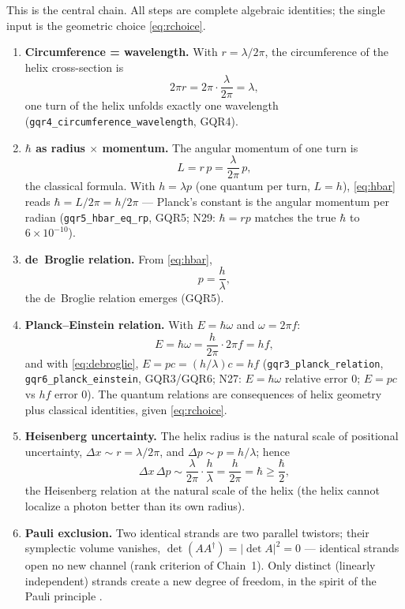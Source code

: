 \documentclass[aps,prd,preprint,superscriptaddress,amsmath,amssymb]{revtex4-2}
\begin{document}
This is the central chain.  All steps are complete algebraic
identities; the single input is the geometric choice
\eqref{eq:rchoice}.

\begin{enumerate}
\item \textbf{Circumference = wavelength.}  With $r=\lambda/2\pi$,
the circumference of the helix cross-section is
\begin{equation}
2\pi r=2\pi\cdot\frac{\lambda}{2\pi}=\lambda,
\label{eq:circ}
\end{equation}
one turn of the helix unfolds exactly one wavelength
(\texttt{gqr4\_circumference\_wavelength}, GQR4).
\item \textbf{$\hbar$ as radius $\times$ momentum.}  The angular momentum
of one turn is
\begin{equation}
L=r\,p=\frac{\lambda}{2\pi}\,p,
\label{eq:hbar}
\end{equation}
the classical formula.  With $h=\lambda p$ (one quantum per turn,
$L=h$), \eqref{eq:hbar} reads
$\hbar=L/2\pi=h/2\pi$ --- Planck's constant is the angular momentum per
radian (\texttt{gqr5\_hbar\_eq\_rp}, GQR5; N29: $\hbar=rp$ matches the
true $\hbar$ to $6\times10^{-10}$).
\item \textbf{de~Broglie relation.}  From \eqref{eq:hbar},
\begin{equation}
p=\frac{h}{\lambda},
\label{eq:debroglie}
\end{equation}
the de~Broglie relation \cite{de1924recherches} emerges (GQR5).
\item \textbf{Planck--Einstein relation.}  With $E=\hbar\omega$ and
$\omega=2\pi f$:
\begin{equation}
E=\hbar\omega=\frac{h}{2\pi}\cdot 2\pi f=hf,
\label{eq:planck}
\end{equation}
and with \eqref{eq:debroglie}, $E=pc=(h/\lambda)c=hf$
(\texttt{gqr3\_planck\_relation}, \texttt{gqr6\_planck\_einstein},
GQR3/GQR6; N27: $E=\hbar\omega$ relative error $0$; $E=pc$ vs $hf$ error
$0$).  The quantum relations are consequences of helix geometry plus
classical identities, given \eqref{eq:rchoice}.
\item \textbf{Heisenberg uncertainty.}  The helix radius is the natural
scale of positional uncertainty, $\Delta x\sim r=\lambda/2\pi$, and
$\Delta p\sim p=h/\lambda$; hence
\begin{equation}
\Delta x\,\Delta p\sim\frac{\lambda}{2\pi}\cdot\frac{h}{\lambda}
=\frac{h}{2\pi}=\hbar\ge\frac{\hbar}{2},
\label{eq:heisenberg}
\end{equation}
the Heisenberg relation \cite{heisenberg1927anschaulichen} at the natural scale of the
helix (the helix cannot localize a photon better than its own radius).
\item \textbf{Pauli exclusion.}  Two identical strands are two parallel
twistors; their symplectic volume vanishes,
$\det(AA^\dagger)=|\det A|^2=0$ --- identical strands open no new channel
(rank criterion of Chain~1).  Only distinct (linearly independent)
strands create a new degree of freedom, in the spirit of the Pauli
principle \cite{pauli1925zusammenhang}.
\end{enumerate}
\end{document}
